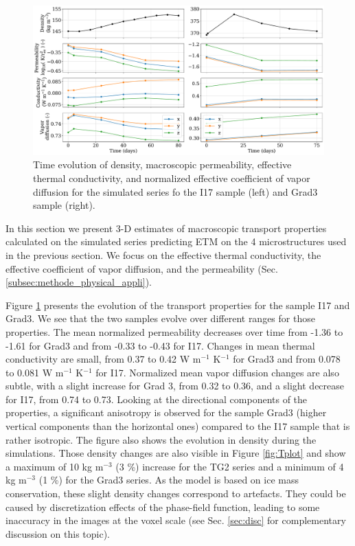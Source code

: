 \documentclass[draft,ms]{agujournal2019}
\begin{document}
\begin{figure}
    \centering
    \includegraphics[width=\linewidth]{Figures/4images_transport_temps_court.pdf}
    \caption{Time evolution of density, macroscopic permeability, effective thermal conductivity, and normalized effective coefficient of vapor diffusion for the simulated series fo the I17 sample (left) and Grad3 sample (right). }
    \label{fig:transport_temps}
\end{figure}

In this section we present 3-D estimates of macroscopic transport properties calculated on the simulated series predicting ETM on the 4 microstructures used in the previous section. We focus on the effective thermal conductivity, the effective coefficient of vapor diffusion, and the permeability (Sec. \ref{subsec:methode_physical_appli}).

Figure \ref{fig:transport_temps} presents the evolution of the transport properties for the sample I17 and Grad3. We see that the two samples evolve over different ranges for those properties. The mean normalized permeability decreases over time from -1.36 to -1.61 for Grad3 and from -0.33 to -0.43 for I17. Changes in mean thermal conductivity are small, from 0.37 to 0.42 W m$^{-1}$ K$^{-1}$ for Grad3 and from 0.078 to 0.081 W m$^{-1}$ K$^{-1}$ for I17. Normalized mean vapor diffusion changes are also subtle, with a slight increase for Grad 3, from 0.32 to 0.36, and a slight decrease for I17, from 0.74 to 0.73. Looking at the directional components of the properties, a significant anisotropy is observed for the sample Grad3 (higher vertical components than the horizontal ones) compared to the I17 sample that is rather isotropic.
%
The figure also shows the evolution in density during the simulations. Those density changes are also visible in Figure \ref{fig:Tplot} and show a maximum of 10 kg m$^{-3}$ (3 \%) increase for the TG2 series and a minimum of 4 kg m$^{-3}$ (1 \%) for the Grad3 series. As the model is based on ice mass conservation, these slight density changes correspond to artefacts. They could be caused by discretization effects of the phase-field function, leading to some inaccuracy in the images at the voxel scale (see Sec. \ref{sec:disc} for complementary discussion on this topic).
\end{document}
